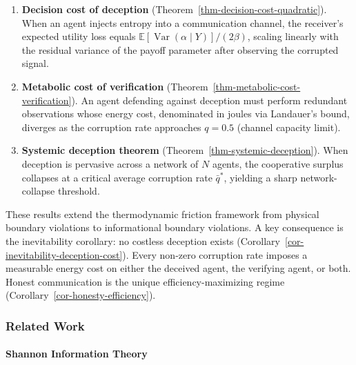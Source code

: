 \documentclass[11pt]{article}
\theoremstyle{plain}
\theoremstyle{definition}
\theoremstyle{remark}
\let\origsubsubsection\subsubsection
\renewcommand{\subsubsection}{\needspace{4\baselineskip}\origsubsubsection}
\let\origparagraphcmd\paragraph
\renewcommand{\paragraph}{\needspace{3\baselineskip}\origparagraphcmd}
\begin{document}
\begin{enumerate}
\def\labelenumi{\arabic{enumi}.}
\item
  \textbf{Decision cost of deception}
  (Theorem~\ref{thm-decision-cost-quadratic}). When an agent injects
  entropy into a communication channel, the receiver's expected utility
  loss equals
  \(\mathbb{E}[\operatorname{Var}(\alpha \mid Y)] / (2\beta)\), scaling
  linearly with the residual variance of the payoff parameter after
  observing the corrupted signal.
\item
  \textbf{Metabolic cost of verification}
  (Theorem~\ref{thm-metabolic-cost-verification}). An agent defending
  against deception must perform redundant observations whose energy
  cost, denominated in joules via Landauer's bound, diverges as the
  corruption rate approaches \(q = 0.5\) (channel capacity limit).
\item
  \textbf{Systemic deception theorem}
  (Theorem~\ref{thm-systemic-deception}). When deception is pervasive
  across a network of \(N\) agents, the cooperative surplus collapses at
  a critical average corruption rate \(\bar{q}^*\), yielding a sharp
  network-collapse threshold.
\end{enumerate}

These results extend the thermodynamic friction framework from physical
boundary violations to informational boundary violations. A key
consequence is the inevitability corollary: no costless deception exists
(Corollary~\ref{cor-inevitability-deception-cost}). Every non-zero
corruption rate imposes a measurable energy cost on either the deceived
agent, the verifying agent, or both. Honest communication is the unique
efficiency-maximizing regime (Corollary~\ref{cor-honesty-efficiency}).

\subsubsection{Related Work}\label{related-work-2}

\paragraph{Shannon Information Theory}\label{shannon-information-theory}
\end{document}
